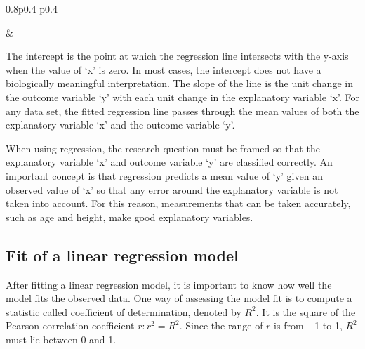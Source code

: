\documentclass[
]{memoir}
\begin{document}
\begin{table}[ht]
\begin{centerbox}
\begin{threeparttable}
\begin{tabularx}{0.8\textwidth}{p{} p{}}
\hhline{}

 &
 \tabularnewline[-0.5pt]


\end{tabularx}
\end{threeparttable}\par\end{centerbox}

\end{table}
 

The intercept is the point at which the regression line intersects with the y-axis when the value of `x' is zero. In most cases, the intercept does not have a biologically meaningful interpretation. The slope of the line is the unit change in the outcome variable `y' with each unit change in the explanatory variable `x'. For any data set, the fitted regression line passes through the mean values of both the explanatory variable `x' and the outcome variable `y'.

When using regression, the research question must be framed so that the explanatory variable `x' and outcome variable `y' are classified correctly. An important concept is that regression predicts a mean value of `y' given an observed value of `x' so that any error around the explanatory variable is not taken into account. For this reason, measurements that can be taken accurately, such as age and height, make good explanatory variables.

\hypertarget{fit-of-a-linear-regression-model}{%
\subsection{Fit of a linear regression model}\label{fit-of-a-linear-regression-model}}

After fitting a linear regression model, it is important to know how well the model fits the observed data. One way of assessing the model fit is to compute a statistic called coefficient of determination, denoted by \(R^2\). It is the square of the Pearson correlation coefficient \(r: r^2 = R^2\). Since the range of \(r\) is from −1 to 1, \(R^2\) must lie between 0 and 1.
\end{document}
